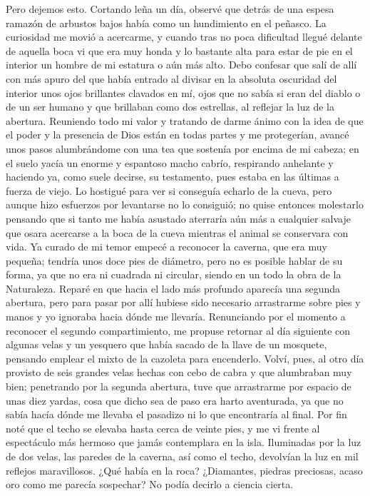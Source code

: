 \documentclass{novela}
\begin{document}
    Pero dejemos esto. Cortando leña un día, observé que detrás de una espesa ramazón de arbustos bajos había como un hundimiento en el peñasco. La curiosidad me movió a acercarme, y cuando tras no poca dificultad llegué delante de aquella boca vi que era muy honda y lo bastante alta para estar de pie en el interior un hombre de mi estatura o aún más alto. Debo confesar que salí de allí con más apuro del que había entrado al divisar en la absoluta oscuridad del interior unos ojos brillantes clavados en mí, ojos que no sabía si eran del diablo o de un ser humano y que brillaban como dos estrellas, al reflejar la luz de la abertura.
    Reuniendo todo mi valor y tratando de darme ánimo con la idea de que el poder y la presencia de Dios están en todas partes y me protegerían, avancé unos pasos alumbrándome con una tea que sostenía por encima de mi cabeza; en el suelo yacía un enorme y espantoso macho cabrío, respirando anhelante y haciendo ya, como suele decirse, su testamento, pues estaba en las últimas a fuerza de viejo.
    Lo hostigué para ver si conseguía echarlo de la cueva, pero aunque hizo esfuerzos por levantarse no lo consiguió; no quise entonces molestarlo pensando que si tanto me había asustado aterraría aún más a cualquier salvaje que osara acercarse a la boca de la cueva mientras el animal se conservara con vida.
    Ya curado de mi temor empecé a reconocer la caverna, que era muy pequeña; tendría unos doce pies de diámetro, pero no es posible hablar de su forma, ya que no era ni cuadrada ni circular, siendo en un todo la obra de la Naturaleza. Reparé en que hacia el lado más profundo aparecía una segunda abertura, pero para pasar por allí hubiese sido necesario arrastrarme sobre pies y manos y yo ignoraba hacia dónde me llevaría. Renunciando por el momento a reconocer el segundo compartimiento, me propuse retornar al día siguiente con algunas velas y un yesquero que había sacado de la llave de un mosquete, pensando emplear el mixto de la cazoleta para encenderlo.
    Volví, pues, al otro día provisto de seis grandes velas hechas con cebo de cabra y que alumbraban muy bien; penetrando por la segunda abertura, tuve que arrastrarme por espacio de unas diez yardas, cosa que dicho sea de paso era harto aventurada, ya que no sabía hacía dónde me llevaba el pasadizo ni lo que encontraría al final. Por fin noté que el techo se elevaba hasta cerca de veinte pies, y me vi frente al espectáculo más hermoso que jamás contemplara en la isla. Iluminadas por la luz de dos velas, las paredes de la caverna, así como el techo, devolvían la luz en mil reflejos maravillosos. ¿Qué había en la roca? ¿Diamantes, piedras preciosas, acaso oro como me parecía sospechar? No podía decirlo a ciencia cierta.
\end{document}
